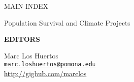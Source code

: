 \documentclass[10pt,final,hyphenatedtitles]{papertex}
\begin{document}
\begin{frontpage}
\begin{indexblock}{MAIN INDEX}
\end{indexblock}

\begin{weatherblock}{Population Survival and Climate Projects}
\end{weatherblock}

\begin{authorblock}
\textbf{EDITORS}

Marc Los Huertos\\
\href{mailto:marc.loshuertos@pomona.edu}{\texttt{marc.loshuertos@pomona.edu}}\\[5pt]
\href{http://github.com/marclos}{http://gighub.com/marclos}\\
\end{authorblock}

\end{frontpage}

\end{document}

